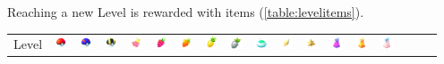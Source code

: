Reaching a new Level is rewarded with items (\autoref{table:levelitems}).
\begin{table}[t]
  \begin{center}
  \setlength{\tabcolsep}{1pt}
  \footnotesize
  \begin{tabular}{l g c g c g c g c g c g c g c g c g}
  Level &
  \includegraphics[width=1em]{images/pokeball.png} &
  \includegraphics[width=1em]{images/greatball.png} &
  \includegraphics[width=1em]{images/ultraball.png} &
  \includegraphics[width=1em]{images/nanab.png} &
  \includegraphics[width=1em]{images/razz.png} &
  \includegraphics[width=1em]{images/goldenrazz.png} &
  \includegraphics[width=1em]{images/pinap.png} &
  \includegraphics[width=1em]{images/silverpinap.png} &
  \includegraphics[width=1em]{images/incense.png} &
  \includegraphics[width=1em]{images/revive.png} &
  \includegraphics[width=1em]{images/maxrevive.png} &
  \includegraphics[width=1em]{images/Potion.png} &
  \includegraphics[width=1em]{images/Super_Potion.png} &
  \includegraphics[width=1em]{images/Hyper_Potion.png} &

\end{tabular}
\end{center}
\end{table}
